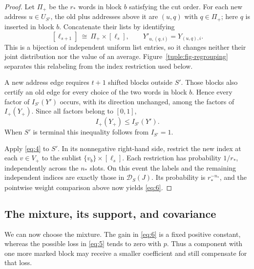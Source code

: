 \begin{proof}
Let $\Pi_+$ be the $r_*$ words in block $b$ satisfying the cut order.
For each new address $u\in U_{S'}$, the old plus addresses above it
are $(u,q)$ with $q\in\Pi_+$; here $q$ is inserted in block $b$.
Concatenate their lists by identifying
\[
 [\ell_{s+1}]\ \cong\ \Pi_+\times[\ell_s],
 \qquad
 Y'_{u,(q,i)}=Y_{(u,q),i}.
\]
This is a bijection of independent uniform list entries, so it changes
neither their joint distribution nor the value of an average.
Figure~\ref{tuple:fig-regrouping} separates this relabeling from the
index restriction used below.



A new address edge requires $t+1$ shifted blocks outside $S'$.  Those blocks
also certify an old edge for every choice of the two words in block
$b$.  Hence every factor of $I_{S'}(Y')$ occurs, with its direction
unchanged, among the factors of $I_+(Y_+)$.  Since all factors belong
to $[0,1]$,
\[
 I_+(Y_+)\le I_{S'}(Y').
\]
When $S'$ is terminal this inequality follows from $I_{S'}=1$.

Apply \eqref{eq:4} to $S'$.  In its nonnegative right-hand side,
restrict the new index at each $v\in V_+$ to the sublist
$\{v_b\}\times[\ell_s]$.  Each restriction has probability $1/r_*$,
independently across the $n_*$ slots.  On this event the labels and
the remaining independent indices are exactly those in
$\mathcal D_S(J)$.  Its probability is $r_*^{-n_*}$, and the
pointwise weight comparison above now yields \eqref{eq:6}.
\end{proof}

\subsection{The mixture, its support, and covariance}

We can now choose the mixture.  The gain in \eqref{eq:6} is a fixed
positive constant, whereas the possible loss in \eqref{eq:5} tends
to zero with $p$.  Thus a component with one more marked block may
receive a smaller coefficient and still compensate for that loss.


